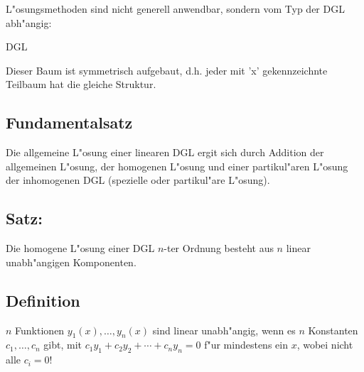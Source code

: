 L"osungsmethoden sind nicht generell anwendbar, sondern vom Typ der DGL abh"angig: \\
\begin{center}
\setlength{\GapWidth}{1.0cm}
\begin{bundle}{DGL}
\end{bundle}
\end{center}

\vspace{3mm}

Dieser Baum ist symmetrisch aufgebaut, d.h. jeder mit 'x' gekennzeichnte Teilbaum hat die
gleiche Struktur.

\subsection{Fundamentalsatz}
Die allgemeine L"osung einer linearen DGL ergit sich durch Addition der allgemeinen
L"osung, der homogenen L"osung und einer partikul"aren L"osung der inhomogenen DGL
(spezielle oder partikul"are L"osung).

\subsection{Satz:}
Die homogene L"osung einer DGL $n$-ter Ordnung besteht aus $n$ linear unabh"angigen
Komponenten.

\subsection{Definition}
$n$ Funktionen $y_1(x), \ldots, y_n(x)$ sind linear unabh"angig, wenn es $n$ Konstanten
$c_1, \ldots, c_n$ gibt, mit $c_1y_1+c_2y_2+\cdots+c_ny_n=0$ f"ur mindestens ein $x$,
wobei nicht alle $c_i=0$!

